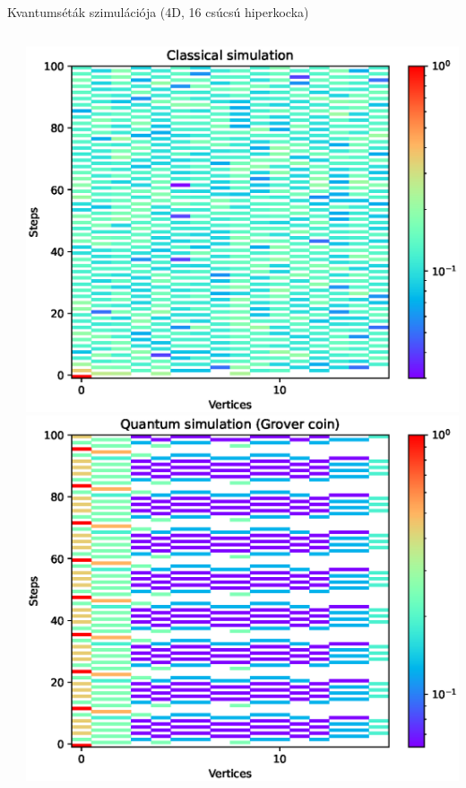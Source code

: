 \documentclass[aspectratio=169]{beamer}
\begin{document}
\begin{frame}{Kvantumséták szimulációja (4D, 16 csúcsú hiperkocka)}

\begin{columns}
\begin{column}{0.20\linewidth}
\end{column}
\begin{column}{0.30\linewidth}
\begin{center}
\includegraphics[width=\linewidth]{./cikk_figures/results/hypercube/classical.eps}
\newline
\includegraphics[width=\linewidth]{./cikk_figures/results/hypercube/grover.eps}

\end{center}
\end{column}
\end{columns}
\end{frame}
\end{document}
